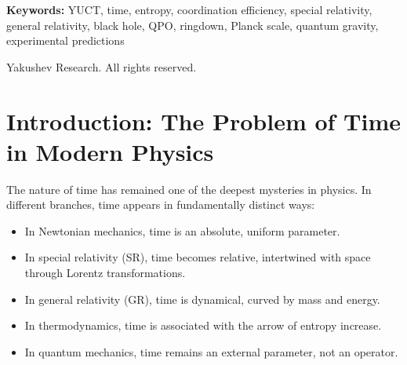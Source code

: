 \documentclass[12pt,a4paper]{article}
\begin{document}
\begin{titlepage}
\begin{center}
\begin{minipage}{0.9\textwidth}
\begin{abstract}
					We extend the framework to black holes, showing that the scaling of time fluctuations with mass follows the universal exponent \(\beta = 0.67\). The relative uncertainty in the rate of time scales as \(\delta\tau/\tau \propto M^{-0.67}\), leading to concrete testable predictions: (i) the width of quasi-periodic oscillations (QPOs) in black hole accretion disks should scale with mass as \(\Delta\nu/\nu \propto M^{-0.67}\); (ii) the dispersion in ringdown frequencies of merging black holes should decrease with mass following the same law. These predictions can be tested with existing X-ray data (RXTE, NuSTAR) and gravitational-wave observations (LIGO/Virgo, future Einstein Telescope). The framework unifies relativistic, gravitational, and thermodynamic aspects of time, providing a coherent picture consistent with the universal scaling law \(\beta = 0.67\) (Appendix L) and the evolutionary dynamics of complex systems (Appendix T).
				\end{abstract}
			\end{minipage}
			
			\vspace{1cm}
			
			\noindent
			\small\textbf{Keywords:} YUCT, time, entropy, coordination efficiency, special relativity, general relativity, black hole, QPO, ringdown, Planck scale, quantum gravity, experimental predictions
			
			\vspace{0.5cm}
			
			\noindent
			 Yakushev Research. All rights reserved.
		\end{center}
	\end{titlepage}
	
	\tableofcontents
	\newpage
	
	\section{Introduction: The Problem of Time in Modern Physics}
	\label{sec:intro}
	
	The nature of time has remained one of the deepest mysteries in physics. In different branches, time appears in fundamentally distinct ways:
	\begin{itemize}
		\item In Newtonian mechanics, time is an absolute, uniform parameter.
		\item In special relativity (SR), time becomes relative, intertwined with space through Lorentz transformations.
		\item In general relativity (GR), time is dynamical, curved by mass and energy.
		\item In thermodynamics, time is associated with the arrow of entropy increase.
		\item In quantum mechanics, time remains an external parameter, not an operator.
	\end{itemize}
	
\end{document}
